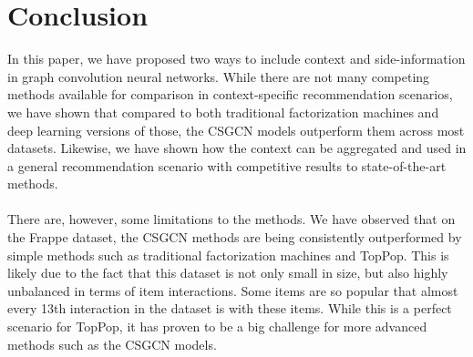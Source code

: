 \section{Conclusion}\label{sec:conclusion}
In this paper, we have proposed two ways to include context and side-information in graph convolution neural networks.
While there are not many competing methods available for comparison in context-specific recommendation scenarios, we have shown that compared to both traditional factorization machines and deep learning versions of those, the CSGCN models outperform them across most datasets.
Likewise, we have shown how the context can be aggregated and used in a general recommendation scenario with competitive results to state-of-the-art methods.
\\\\
There are, however, some limitations to the methods.
We have observed that on the Frappe dataset, the CSGCN methods are being consistently outperformed by simple methods such as traditional factorization machines and TopPop.
This is likely due to the fact that this dataset is not only small in size, but also highly unbalanced in terms of item interactions.
Some items are so popular that almost every 13th interaction in the dataset is with these items.
While this is a perfect scenario for TopPop, it has proven to be a big challenge for more advanced methods such as the CSGCN models.

